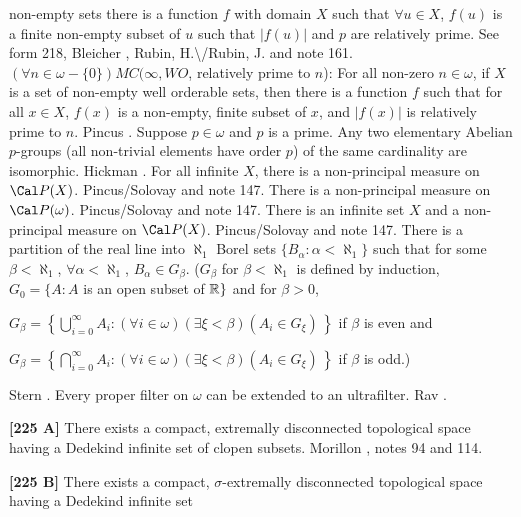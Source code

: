 non-empty sets there is a function $f$ with domain $X$ such that $\forall
u \in X$, $f(u)$ is a finite non-empty subset of $u$ such that  $|f(u)|$
and $p$ are relatively prime. See form 218, \ac{Bleicher} \cite{1964},
\ac{Rubin, H.\/Rubin, J.} \cite{1985, p.124} and note 161.
\medskip
{}  $(\forall n\in\omega-\{0\}) MC(\infty,WO$,
relatively prime to $n$): For all non-zero $n\in \omega$, if $X$ is a set
of non-empty well orderable sets, then there is a function $f$ such that
for all $x\in X$, $f(x)$ is a non-empty, finite subset of $x$,
and $|f(x)|$ is relatively prime to $n$.  \ac{Pincus} \cite{1972a}.
\medskip
{} Suppose $p\in\omega$ and $p$ is a prime.
Any two elementary Abelian $p$-groups (all non-trivial elements have
order $p$) of the same cardinality are isomorphic. \ac{Hickman}
\cite{1977b}.
\medskip
{} For all infinite $X$, there is a non-principal
measure on $\Cal P(X)$.  \ac{Pincus/Solovay} \cite{1977} and note 147.
\medskip
{} There is a non-principal measure on
$\Cal P(\omega)$.  \ac{Pincus/Solovay} \cite{1977} and note 147.
\medskip
{} There is an infinite set $X$ and a non-principal
measure on $\Cal P(X)$.  \ac{Pincus/Solovay} \cite{1977} and note 147.
\medskip
{}  There is a partition of the real line into
$\aleph_1$ Borel sets $\{B_\alpha: \alpha<\aleph_1\}$ such that for some
$\beta <\aleph_1$, $\forall\alpha <\aleph_1$, $B_{\alpha}\in G_{\beta}$.
($G_\beta$ for $\beta < \aleph_1$ is defined by induction, $G_0=\{A: A$
is an open subset of ${\Bbb R}\}$ and for $\beta > 0$,
\item{}$G_\beta =\left\{\bigcup^\infty_{i=0}A_{i}: (\forall i\in\omega)
(\exists\xi <\beta)(A_i\in G_\xi)\,\right\}$ if $\beta$ is even and
\item{}$G_\beta = \left\{\bigcap^\infty_{i=0}A_{i}: (\forall i\in\omega)
(\exists \xi < \beta)(A_{i}\in G_\xi)\,\right\}$ if $\beta$ is odd.)
\item{}\ac{Stern} \cite{1979}.
\medskip
{}  Every proper filter on $\omega$ can be extended
to an ultrafilter.  \ac{Rav} \cite{1977}.
\smallskip
\item{}{\bf [225 A]}  There exists a compact, extremally disconnected
topological space having a Dedekind infinite set of clopen subsets.
\ac{Morillon} \cite{1993}, notes 94 and 114.
\smallskip
\item{}{\bf [225 B]}  There exists a compact, $\sigma$-extremally
disconnected topological space having a Dedekind infinite set
